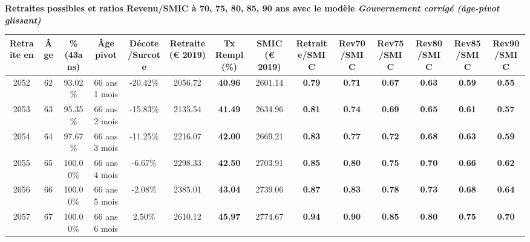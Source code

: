  \vspace{0.1cm} 
{\bf \noindent Retraites possibles et ratios Revenu/SMIC à 70, 75, 80, 85, 90 ans avec le modèle \emph{Gouvernement corrigé (âge-pivot glissant)}}  
 
\begin{adjustbox}{max width=\textwidth} 
\begin{tabular}[htb]{|c|c||c|c|c||c|c||c||c|c|c|c|c|c|} 
\hline 
 Retraite en &  Âge &  \%(43ans) &  Âge pivot &  Décote/Surcote &  Retraite (\euro{} 2019) &  Tx Rempl(\%) &  SMIC (\euro{} 2019) &  Retraite/SMIC &  Rev70/SMIC &  Rev75/SMIC &  Rev80/SMIC &  Rev85/SMIC &  Rev90/SMIC \\ 
\hline \hline 
 2052 &  62 &  93.02\% &  66 ans 1 mois &  -20.42\% &  2056.72 &  {\bf 40.96} &  2601.14 &  {\bf {\color{red} 0.79}} &  {\bf {\color{red} 0.71}} &  {\bf {\color{red} 0.67}} &  {\bf {\color{red} 0.63}} &  {\bf {\color{red} 0.59}} &  {\bf {\color{red} 0.55}} \\ 
\hline 
 2053 &  63 &  95.35\% &  66 ans 2 mois &  -15.83\% &  2135.54 &  {\bf 41.49} &  2634.96 &  {\bf {\color{red} 0.81}} &  {\bf {\color{red} 0.74}} &  {\bf {\color{red} 0.69}} &  {\bf {\color{red} 0.65}} &  {\bf {\color{red} 0.61}} &  {\bf {\color{red} 0.57}} \\ 
\hline 
 2054 &  64 &  97.67\% &  66 ans 3 mois &  -11.25\% &  2216.07 &  {\bf 42.00} &  2669.21 &  {\bf {\color{red} 0.83}} &  {\bf {\color{red} 0.77}} &  {\bf {\color{red} 0.72}} &  {\bf {\color{red} 0.68}} &  {\bf {\color{red} 0.63}} &  {\bf {\color{red} 0.59}} \\ 
\hline 
 2055 &  65 &  100.00\% &  66 ans 4 mois &  -6.67\% &  2298.33 &  {\bf 42.50} &  2703.91 &  {\bf {\color{red} 0.85}} &  {\bf {\color{red} 0.80}} &  {\bf {\color{red} 0.75}} &  {\bf {\color{red} 0.70}} &  {\bf {\color{red} 0.66}} &  {\bf {\color{red} 0.62}} \\ 
\hline 
 2056 &  66 &  100.00\% &  66 ans 5 mois &  -2.08\% &  2385.01 &  {\bf 43.04} &  2739.06 &  {\bf {\color{red} 0.87}} &  {\bf {\color{red} 0.83}} &  {\bf {\color{red} 0.78}} &  {\bf {\color{red} 0.73}} &  {\bf {\color{red} 0.68}} &  {\bf {\color{red} 0.64}} \\ 
\hline 
 2057 &  67 &  100.00\% &  66 ans 6 mois &  2.50\% &  2610.12 &  {\bf 45.97} &  2774.67 &  {\bf {\color{red} 0.94}} &  {\bf {\color{red} 0.90}} &  {\bf {\color{red} 0.85}} &  {\bf {\color{red} 0.80}} &  {\bf {\color{red} 0.75}} &  {\bf {\color{red} 0.70}} \\ 
\hline 
\hline 
\end{tabular} 
\end{adjustbox} 
 
